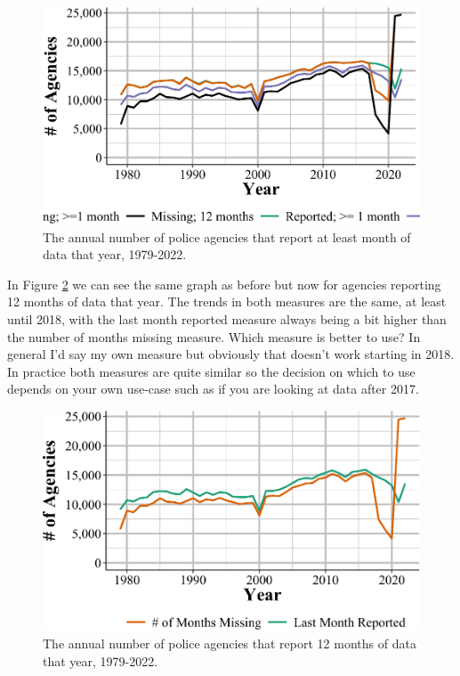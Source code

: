 \documentclass[
  12pt,
  openany]{book}
\begin{document}
\begin{figure}

{\centering \includegraphics[width=0.9\linewidth]{08_arson_files/figure-latex/arsonAgencies-1} 

}

\caption{The annual number of police agencies that report at least month of data that year, 1979-2022.}\label{fig:arsonAgencies}
\end{figure}

In Figure \ref{fig:arsonAgencies12Months} we can see the same graph as before but now for agencies reporting 12 months of data that year. The trends in both measures are the same, at least until 2018, with the last month reported measure always being a bit higher than the number of months missing measure. Which measure is better to use? In general I'd say my own measure but obviously that doesn't work starting in 2018. In practice both measures are quite similar so the decision on which to use depends on your own use-case such as if you are looking at data after 2017.

\begin{figure}

{\centering \includegraphics[width=0.9\linewidth]{08_arson_files/figure-latex/arsonAgencies12Months-1} 

}

\caption{The annual number of police agencies that report 12 months of data that year, 1979-2022.}\label{fig:arsonAgencies12Months}
\end{figure}
\end{document}
